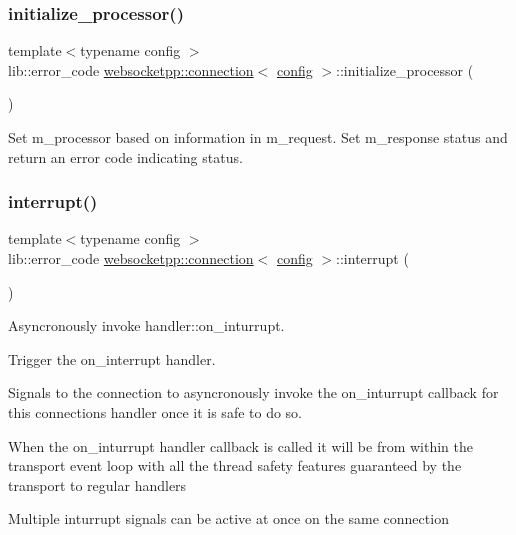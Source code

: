\subsubsection{\texorpdfstring{initialize\+\_\+processor()}{initialize\_processor()}}
{\footnotesize\ttfamily template$<$typename config $>$ \\
lib\+::error\+\_\+code \mbox{\hyperlink{classwebsocketpp_1_1connection}{websocketpp\+::connection}}$<$ \mbox{\hyperlink{classconfig}{config}} $>$\+::initialize\+\_\+processor (\begin{DoxyParamCaption}{ }\end{DoxyParamCaption})\hspace{0.3cm}{\ttfamily [protected]}}

Set m\+\_\+processor based on information in m\+\_\+request. Set m\+\_\+response status and return an error code indicating status. \mbox{\label{classwebsocketpp_1_1connection_a12bbbc93d414c65492ffb2c4a12f05a8}} 
\subsubsection{\texorpdfstring{interrupt()}{interrupt()}}
{\footnotesize\ttfamily template$<$typename config $>$ \\
lib\+::error\+\_\+code \mbox{\hyperlink{classwebsocketpp_1_1connection}{websocketpp\+::connection}}$<$ \mbox{\hyperlink{classconfig}{config}} $>$\+::interrupt (\begin{DoxyParamCaption}{ }\end{DoxyParamCaption})}



Asyncronously invoke handler\+::on\+\_\+inturrupt. 

Trigger the on\+\_\+interrupt handler.

Signals to the connection to asyncronously invoke the on\+\_\+inturrupt callback for this connection\textquotesingle{}s handler once it is safe to do so.

When the on\+\_\+inturrupt handler callback is called it will be from within the transport event loop with all the thread safety features guaranteed by the transport to regular handlers

Multiple inturrupt signals can be active at once on the same connection

